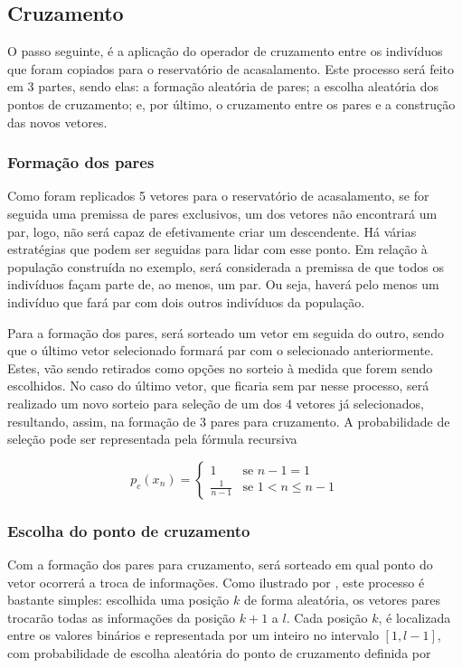 \subsection{Cruzamento}

O passo seguinte, é a aplicação do operador de cruzamento entre os indivíduos que foram copiados para o reservatório de acasalamento. Este processo será feito em 3 partes, sendo elas: a formação aleatória de pares; a escolha aleatória dos pontos de cruzamento; e, por último, o cruzamento entre os pares e a construção das novos vetores.

\subsubsection{Formação dos pares}

Como foram replicados 5 vetores para o reservatório de acasalamento, se for seguida uma premissa de pares exclusivos, um dos vetores não encontrará um par, logo, não será capaz de efetivamente criar um descendente. Há várias estratégias que podem ser seguidas para lidar com esse ponto. Em relação à população construída no exemplo, será considerada a premissa de que todos os indivíduos façam parte de, ao menos, um par. Ou seja, haverá pelo menos um indivíduo que fará par com dois outros indivíduos da população. 

Para a formação dos pares, será sorteado um vetor em seguida do outro, sendo que o último vetor selecionado formará par com o selecionado anteriormente. Estes, vão sendo retirados como opções no sorteio à medida que forem sendo escolhidos. No caso do último vetor, que ficaria sem par nesse processo, será realizado um novo sorteio para seleção de um dos 4 vetores já selecionados, resultando, assim, na formação de 3 pares para cruzamento. A probabilidade de seleção pode ser representada pela fórmula recursiva

\begin{equation}
	p_{c}(x_{n}) = {
		\begin{cases}
			1 &\text{se $n-1 = 1$} \\
			\frac{1}{n-1} & \text{se $1 < n \leq n-1$}
		\end{cases}
	}
\end{equation}

\subsubsection{Escolha do ponto de cruzamento}

Com a formação dos pares para cruzamento, será sorteado em qual ponto do vetor ocorrerá a troca de informações. Como ilustrado por \citet[p.12]{goldberg_genetic_1989}, este processo é bastante simples: escolhida uma posição $k$ de forma aleatória, os vetores pares trocarão todas as informações da posição $k + 1$ a $l$. Cada posição $k$, é localizada entre os valores binários e representada por um inteiro no intervalo $\left[1, l - 1\right]$, com probabilidade de escolha aleatória do ponto de cruzamento definida por

